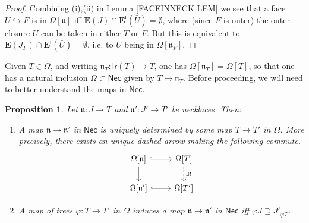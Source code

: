 \documentclass[a4paper,10pt
,draft
]{article}%
\numberwithin{equation}{section}
\numberwithin{figure}{section}
\newtheorem{proposition}[equation]{Proposition}%
\theoremstyle{definition} %
\newcommand{\1}{\ensuremath{\mathbbm 1}}%
\begin{document}
\begin{proof}
	Combining (i),(ii) in 
	Lemma \ref{FACEINNECK LEM}
	we see that a face $U \hookrightarrow F$ is
	in $\Omega[\mathfrak{n}]$
	iff $\boldsymbol{E}(J) \cap 
	\boldsymbol{E}^{\mathsf{i}}(\bar{U}) = \emptyset$,
	where (since $F$ is outer) the outer closure $\bar{U}$
	can be taken in either $T$ or $F$.
	But this is equivalent to 
	$\boldsymbol{E}(J_F) \cap 
	\boldsymbol{E}^{\mathsf{i}}(\bar{U}) = \emptyset$,
	i.e. to $U$ being in $\Omega[\mathfrak{n}_F]$.
\end{proof}



Given $T \in \Omega$,
and writing $\mathfrak{n}_T \colon \mathsf{lr}(T) \to T$,
one has 
$\Omega[\mathfrak{n}_T] = \Omega[T]$,
so that one has a natural inclusion
$\Omega \subset \mathsf{Nec}$
given by $T \mapsto \mathfrak{n}_T$.
Before proceeding, we will need to better understand the maps in 
$\mathsf{Nec}$.





\begin{proposition}\label{MAPNECK PROP}
	Let $\mathfrak{n}\colon J \to T$ and $\mathfrak{n}' \colon J' \to T'$ be necklaces. Then:
\begin{enumerate}
\item[(i)]
	A map $\mathfrak{n} \to \mathfrak{n}'$ in $\mathsf{Nec}$
	is uniquely determined by some map 
	$T \to T'$ in $\Omega$. 
	More precisely, there exists an unique dashed arrow
	making the following commute.
\begin{equation}\label{NECKMAP EQ}
\begin{tikzcd}
	\Omega[\mathfrak{n}] 
	\ar[hookrightarrow]{r} 
	\ar{d}
&
	\Omega[T] 
	\ar[dashed]{d}{\exists !}
\\
	\Omega[\mathfrak{n}']
	\ar[hookrightarrow]{r}
&
	\Omega[T']
	\end{tikzcd}
\end{equation}
\item[(ii)]
	A map of trees 
	$\varphi \colon T \to T'$ in $\Omega$
	induces a map 
	$\mathfrak{n} \to \mathfrak{n}'$ in $\mathsf{Nec}$
	iff
	$\varphi J \supseteq J'_{\overline{\varphi T}}$.
\end{enumerate}
\end{proposition}
\end{document}
